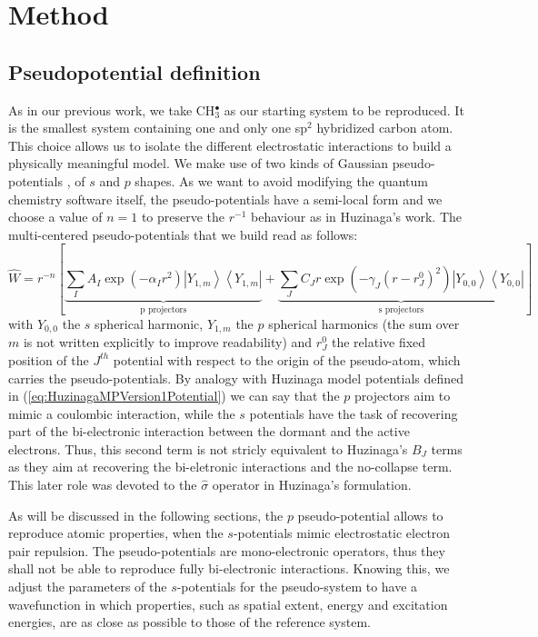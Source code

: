 \documentclass[journal=jctcce,manuscript=article]{achemso}
\begin{document}
\section{Method}

\subsection{Pseudopotential definition}

As in our previous work\cite{drujon_pseudopotentials_2013},
we take CH\(^{\bullet}_{3}\) as our starting system to be reproduced.
It is the smallest system containing one and only one sp$^2$ hybridized carbon atom.
This choice allows us to isolate the different electrostatic interactions
to build a physically meaningful model.
We make use of two kinds of Gaussian pseudo-potentials \cite{me_structure_theory}, of \(s\) and \(p\) shapes. As we want to avoid modifying the quantum chemistry software itself, the pseudo-potentials have a semi-local form and we choose a value of \(n = 1\) to preserve the \(r^{-1}\) behaviour as in Huzinaga's work.
The multi-centered pseudo-potentials that we build read as follows:
\begin{equation}
\label{eq:ourPP}
\hat{W} = r^{-n}\left[%
\underbrace{\sum_IA_I\exp(-\alpha_I r^2)\left|Y_{1,m}\right>\left<Y_{1,m}\right|}_{\text{p projectors}}%
+%
\underbrace{\sum_JC_Jr\exp(-\gamma_J (r-r^0_J)^2)\left|Y_{0,0}\right>\left<Y_{0,0}\right|}_{\text{s projectors}}%
\right]
\end{equation}
with $Y_{0,0}$ the $s$ spherical harmonic, $Y_{1,m}$ the $p$ spherical harmonics (the sum over $m$
is not written explicitly to improve readability) and $r^0_J$ the relative fixed position of the $J^{th}$
potential with respect to the origin of the pseudo-atom, which carries the pseudo-potentials.
By analogy with Huzinaga model potentials defined in (\ref{eq:HuzinagaMPVersion1Potential})
we can say that the $p$ projectors aim to mimic a coulombic interaction,
while the $s$ potentials have the task of recovering part of the bi-electronic interaction
between the dormant and the active electrons.
Thus, this second term is not stricly equivalent to Huzinaga's $B_J$ terms as they aim at recovering
the bi-eletronic interactions and the no-collapse term.
This later role was devoted to the $\hat{\sigma}$ operator in Huzinaga's formulation.

As will be discussed in the following sections,
the \(p\) pseudo-potential allows to reproduce atomic properties, when the
\(s\)-potentials mimic electrostatic electron pair repulsion. The pseudo-potentials are mono-electronic operators, thus they shall not be able to reproduce fully bi-electronic interactions. Knowing this, we adjust the parameters of the \(s\)-potentials for the pseudo-system to have a wavefunction in which properties, such as spatial extent, energy and excitation energies, are as close as possible to those of the reference system.
\end{document}
